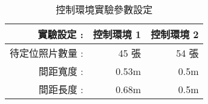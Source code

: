 \begin{table}[htbp]
  \centering
  \caption{控制環境實驗參數設定}
    \begin{tabular}{rrr}
    \toprule
    實驗設定 :  & 控制環境 1 & 控制環境 2 \\
    \midrule
    待定位照片數量 : & 45 張  & 54 張 \\
    間距寬度 : & 0.53m & 0.5m \\
    間距長度 : & 0.68m & 0.5m \\
    \bottomrule
    \end{tabular}%
  \label{table:Controlled EV parameters}%
\end{table}%
